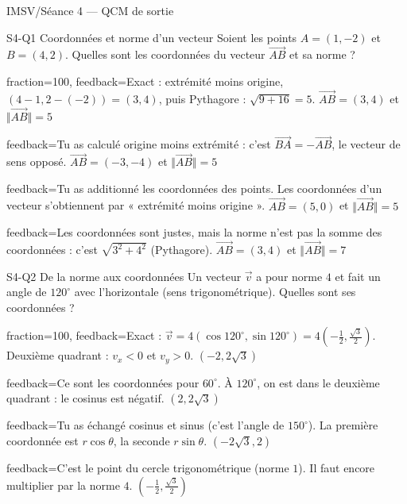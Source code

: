 \documentclass[11pt]{article}
\begin{document}
\begin{quiz}{IMSV/Séance 4 — QCM de sortie}

\begin{multi}[penalty=0, shuffle=true, numbering=abc,
  feedback={Le vecteur $\overrightarrow{AB}$ décrit le déplacement de $A$ vers $B$ :
  $\overrightarrow{AB} = (x_B - x_A, y_B - y_A)$. Sa norme se calcule par Pythagore.
  Voir \emph{Coordonnées cartésiennes} et \emph{Norme d'un vecteur}.}]{S4-Q1 Coordonnées et norme d'un vecteur}
Soient les points $A = (1, -2)$ et $B = (4, 2)$. Quelles sont les coordonnées du vecteur
$\overrightarrow{AB}$ et sa norme ?
\item[fraction=100, feedback={Exact : extrémité moins origine, $(4 - 1, 2 - (-2)) = (3, 4)$, puis
  Pythagore : $\sqrt{9 + 16} = 5$.}]
  $\overrightarrow{AB} = (3, 4)$ et $\Vert\overrightarrow{AB}\Vert = 5$
\item[feedback={Tu as calculé origine moins extrémité : c'est $\overrightarrow{BA} = -\overrightarrow{AB}$,
  le vecteur de sens opposé.}]
  $\overrightarrow{AB} = (-3, -4)$ et $\Vert\overrightarrow{AB}\Vert = 5$
\item[feedback={Tu as additionné les coordonnées des points. Les coordonnées d'un vecteur s'obtiennent
  par « extrémité moins origine ».}]
  $\overrightarrow{AB} = (5, 0)$ et $\Vert\overrightarrow{AB}\Vert = 5$
\item[feedback={Les coordonnées sont justes, mais la norme n'est pas la somme des coordonnées :
  c'est $\sqrt{3^2 + 4^2}$ (Pythagore).}]
  $\overrightarrow{AB} = (3, 4)$ et $\Vert\overrightarrow{AB}\Vert = 7$
\end{multi}

\begin{multi}[penalty=0, shuffle=true, numbering=abc,
  feedback={Pour $\vec v$ de norme $r$ formant l'angle $\theta$ avec l'horizontale :
  $\vec v = (r\cos\theta, r\sin\theta)$. Les signes des coordonnées doivent correspondre au
  quadrant. Voir \emph{De la norme aux coordonnées}.}]{S4-Q2 De la norme aux coordonnées}
Un vecteur $\vec v$ a pour norme $4$ et fait un angle de $120^\circ$ avec l'horizontale (sens
trigonométrique). Quelles sont ses coordonnées ?
\item[fraction=100, feedback={Exact : $\vec v = 4(\cos 120^\circ, \sin 120^\circ)
  = 4\left(-\frac12, \frac{\sqrt3}{2}\right)$. Deuxième quadrant : $v_x < 0$ et $v_y > 0$.}]
  $\left(-2, 2\sqrt3\right)$
\item[feedback={Ce sont les coordonnées pour $60^\circ$. À $120^\circ$, on est dans le deuxième
  quadrant : le cosinus est négatif.}]
  $\left(2, 2\sqrt3\right)$
\item[feedback={Tu as échangé cosinus et sinus (c'est l'angle de $150^\circ$). La première coordonnée
  est $r\cos\theta$, la seconde $r\sin\theta$.}]
  $\left(-2\sqrt3, 2\right)$
\item[feedback={C'est le point du cercle trigonométrique (norme $1$). Il faut encore multiplier par la
  norme $4$.}]
  $\left(-\frac12, \frac{\sqrt3}{2}\right)$
\end{multi}


\end{quiz}
\end{document}
